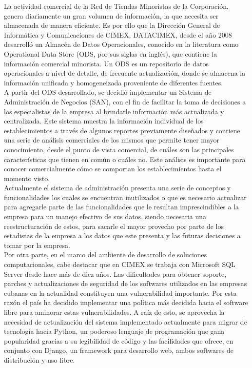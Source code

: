 La actividad comercial de la Red de Tiendas Minoristas de la Corporación, genera diariamente un gran volumen de información, la que necesita ser almacenada de manera eficiente. Es por ello que la Dirección General de Informática y Comunicaciones de CIMEX,  DATACIMEX, desde el año 2008 desarrolló un Almacén de Datos Operacionales, conocido en la literatura como Operational Data Store (ODS, por sus siglas en inglés), que contiene la información comercial minorista. Un ODS es un repositorio de datos operacionales a nivel de detalle, de frecuente actualización, donde se almacena la información unificada y homogeneizada proveniente de diferentes fuentes. \\

A partir del ODS desarrollado, se decidió implementar un Sistema de Administración de Negocios (SAN), con el fin de facilitar la toma de decisiones a los especialistas de la empresa al brindarle información más actualizada y centralizada. Este sistema muestra la información individual de los establecimientos a través de algunos reportes previamente diseñados y  contiene una serie de análisis comerciales de los mismos que permite tener mayor conocimiento, desde el punto de vista comercial, de cuáles son las principales características que tienen en común o cuáles no. Este análisis es importante para conocer comercialmente cómo se comportan los establecimientos hasta el momento visto.\\

Actualmente el sistema de administración presenta una serie de conceptos y funcionalidades los cuales se encuentran inutilizados o que es necesario actualizar para agregarle parte de las funcionalidades que le resultan imprescindibles a la empresa para un manejo efectivo de sus datos, siendo necesaria una reestructuración de estos, para sacarle el mayor provecho por parte de los estadistas de la empresa a los datos que este presenta y las futuras decisiones a tomar por la empresa. \\

Por otra parte, en el marco del ambiente de desarrollo de soluciones computacionales, cabe destacar que en CIMEX se trabaja con Microsoft SQL Server desde hace más de diez años. Las dificultades para obtener soporte, parches y actualizaciones de seguridad de los softwares utilizados en las empresas cubanas en la actualidad constituyen una vulnerabilidad importante. Por esta razón el país ha decidido implementar una política más decidida hacia el software libre para aminorar estas vulnerabilidades. A raíz de esto, se aprovecha la necesidad de actualización del sistema implementado actualmente para migrar de tecnología hacia Python, un poderoso lenguaje de programación que gana popularidad gracias a su legibilidad de código y las facilidades que ofrece, en conjunto con Django, un framework para desarrollo web, ambos softwares de distribución y uso libre.  
\newpage

